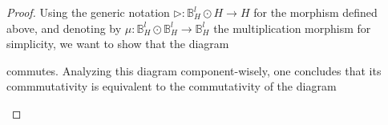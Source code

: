 \documentclass[10pt,a4paper]{amsart}
\newcommand{\Hilb}{\mathrm{Hilb}}
\newcommand{\bB}{\mathbb B}
\newcommand{\cC}{\mathcal C}
\newcommand{\id}{\mathrm{id}}
\begin{document}
\begin{proof}
    Using the generic notation $\triangleright: \bB^l_H \odot H \to H$ for the morphism defined above, and denoting by $\mu: \bB^l_H \odot \bB^l_H \to \bB^l_H$ the multiplication morphism for simplicity, we want to show that the diagram
    \begin{center}
    \end{center}
    commutes. Analyzing this diagram component-wisely, one concludes that its commmutativity is equivalent to the commutativity of the diagram
    \begin{center}
\end{center}
\end{proof}
\end{document}
